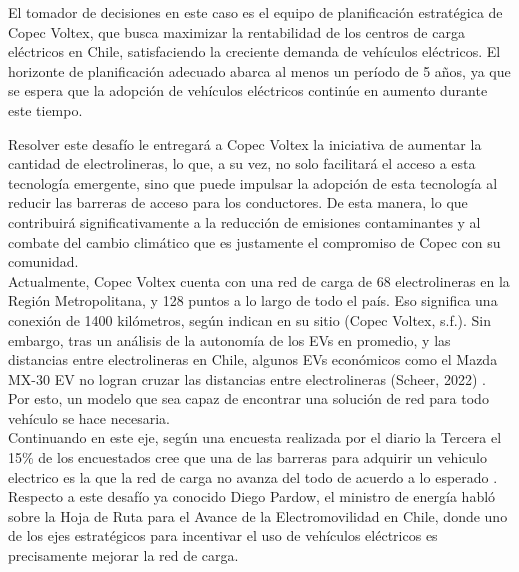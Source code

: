 \documentclass[letterpaper]{article}
\begin{document}
\begin{flushleft}
	El tomador de decisiones en este caso es el equipo de planificación estratégica de Copec Voltex, que busca maximizar la rentabilidad de los centros de carga eléctricos en Chile, satisfaciendo la creciente demanda de vehículos eléctricos. El horizonte de planificación adecuado abarca al menos un período de 5 años, ya que se espera que la adopción de vehículos eléctricos continúe en aumento durante este tiempo.

	Resolver este desafío le entregará a Copec Voltex la iniciativa de aumentar la cantidad de electrolineras, lo que, a su vez, no solo facilitará el acceso a esta tecnología emergente, sino que puede impulsar la adopción de esta tecnología al reducir las barreras de acceso para los conductores. De esta manera, lo que contribuirá significativamente a la reducción de emisiones contaminantes y al combate del cambio climático que es justamente el compromiso de Copec con su comunidad. \\

	Actualmente, Copec Voltex cuenta con una red de carga de 68 electrolineras en la Región Metropolitana, y 128 puntos a lo largo de todo el país. Eso significa una conexión de 1400 kilómetros, según indican en su sitio (Copec Voltex, s.f.). Sin embargo, tras un análisis de la autonomía de los EVs en promedio, y las distancias entre electrolineras en Chile, algunos EVs económicos como el Mazda MX-30 EV no logran cruzar las distancias entre electrolineras (Scheer, 2022) \cite{scheer}. Por esto, un modelo que sea capaz de encontrar una solución de red para todo vehículo se hace necesaria. \\

	Continuando en este eje, según una encuesta realizada por el diario la Tercera el 15\% de los encuestados cree que una de las barreras para adquirir un vehiculo electrico es la que la red de carga no avanza del todo de acuerdo a lo esperado \cite{Tercera}. Respecto a este desafío ya conocido Diego Pardow, el ministro de energía habló sobre la Hoja de Ruta para el Avance de la Electromovilidad en Chile, donde uno de los ejes estratégicos para incentivar el uso de vehículos eléctricos es precisamente mejorar la red de carga.


\end{flushleft}
\end{document}
